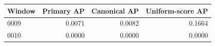 \begin{tabular}{@{}lrrr@{}}
\toprule
Window & Primary AP & Canonical AP & Uniform-score AP \\
\midrule
0009 & 0.0071 & 0.0082 & 0.1664 \\
0010 & 0.0000 & 0.0000 & 0.0000 \\
\bottomrule
\end{tabular}
